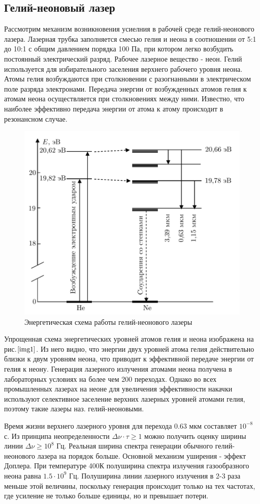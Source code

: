 \documentclass[a4paper,12pt]{article}
\begin{document}
\subsection{Гелий-неоновый лазер}

Рассмотрим механизм возникновения усиелния в рабочей среде гелий-неонового лазера. Лазерная трубка заполняется смесью гелия и неона в соотношении от 5:1 до 10:1 с общим давлением порядка 100 Па, при котором легко возбудить постоянный электрический разряд. Рабочее лазерное вещество - неон. Гелий используется для избирательного заселения верхнего рабочего уровня неона. Атомы гелия возбуждаются при столкновении с разогнанными в электрическом поле разряда электронами. Передача энергии от возбужденных атомов гелия к атомам неона осуществляется при столкновениях между ними. Известно, что наиболее эффективно передача энергии от атома к атому происходит в резонансном случае. 

\begin{figure}[h]
\centering
\includegraphics[width=0.6\linewidth]{img1.png}
\caption{Энергетическая схема работы гелий-неонового лазеры}
\label{img1}
\end{figure}

Упрощенная схема энергетических уровней атомов гелия и неона изображена на рис.$\ref{img1}$. Из него видно, что энергии двух уровней атома гелия действительно близки к двум уровням неона, что приводит к эффективной передаче энергии от гелия к неону. Генерация лазерного излучения атомами неона получена в лабораторных условиях на более чем 200 переходах. Однако во всех промышленных лазерах на неоне для увеличения эффективности накачки используют селективное заселение верхних лазерных уровней атомами гелия, поэтому такие лазеры наз. \textit{}{гелий-неоновыми}.

Время жизни верхнего лазерного уровня для перехода 0.63 мкм составляет $10^{-8}$ с. Из принципа неопределенности $\Delta\nu\cdot\tau\geq 1$ можно получить оценку ширины линии $\Delta\nu\geq10^8$ Гц. Реальная ширина спектра генерации обычного гелий-неонового лазера на порядок больше. Основной механизм уширения - эффект Доплера. При температуре 400К полуширина спектра излучения газообразного неона равна $1.5\cdot10^9$ Гц. Полуширина линии лазерного излучения в 2-3 раза меньше этой величины, поскольку генерация происходит только на тех частотах, где усиление не только больше единицы, но и превышает потери.
\end{document}
